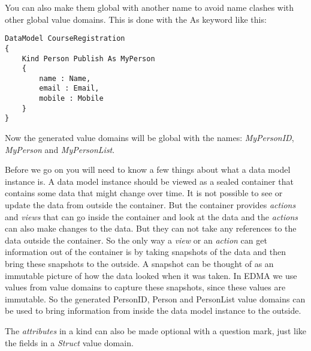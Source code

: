 You can also make them global with another name to avoid name clashes
with other global value domains. This is done with the As keyword
like this:
\begin{lstlisting}[basicstyle={\scriptsize}]
DataModel CourseRegistration
{
	Kind Person Publish As MyPerson
	{
		name : Name,
		email : Email,
		mobile : Mobile
	}
}
\end{lstlisting}


Now the generated value domains will be global with the names: \emph{MyPersonID},
\emph{MyPerson} and \emph{MyPersonList}.

Before we go on you will need to know a few things about what a data
model instance is. A data model instance should be viewed as a sealed
container that contains some data that might change over time. It
is not possible to see or update the data from outside the container.
But the container provides \emph{actions} and \emph{views} that can
go inside the container and look at the data and the \emph{actions}
can also make changes to the data. But they can not take any references
to the data outside the container. So the only way a \emph{view} or
an \emph{action} can get information out of the container is by taking
snapshots of the data and then bring these snapshots to the outside.
A snapshot can be thought of as an immutable picture of how the data
looked when it was taken. In EDMA we use values from value domains
to capture these snapshots, since these values are immutable. So the
generated PersonID, Person and PersonList value domains can be used
to bring information from inside the data model instance to the outside.

The \emph{attributes} in a kind can also be made optional with a question
mark, just like the fields in a \emph{Struct} value domain.

